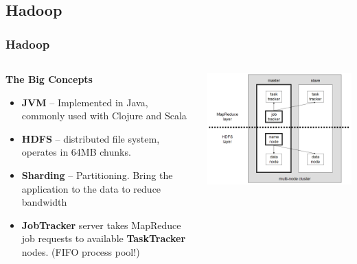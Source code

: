 \documentclass[t]{beamer}
\begin{document}
\subsection{Hadoop}
\begin{frame}
\frametitle{Hadoop}
\begin{columns}
\begin{column}{.5\textwidth}
\textbf{The Big Concepts}
\small{\begin{itemize}

  \item \textbf{JVM} -- Implemented in Java, commonly used with Clojure and Scala
  \pause
  \item \textbf{HDFS} -- distributed file system, operates in 64MB chunks.
  \pause
  \item \textbf{Sharding} -- Partitioning. Bring the application to the data to reduce bandwidth
  \pause
  \item \textbf{JobTracker} server takes MapReduce job requests to available \textbf{TaskTracker} nodes. (FIFO process pool!)
\end{itemize}}
\end{column}
\begin{column}{.5\textwidth}
\includegraphics[width=1.0\textwidth]{img/Hadoop_1.png} 
\end{column}
\end{columns}
\end{frame}

\end{document}
